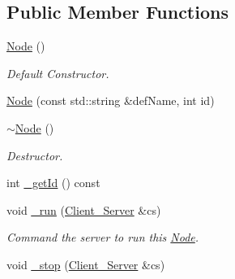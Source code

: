 \subsection*{Public Member Functions}
\begin{DoxyCompactItemize}
\item 
\hypertarget{classColliderPlusPlus_1_1Node_aaad80bfe23840414c3522f5a25f5771a}{\hyperlink{classColliderPlusPlus_1_1Node_aaad80bfe23840414c3522f5a25f5771a}{Node} ()}\label{classColliderPlusPlus_1_1Node_aaad80bfe23840414c3522f5a25f5771a}

\begin{DoxyCompactList}\small\item\em Default Constructor. \end{DoxyCompactList}\item 
\hyperlink{classColliderPlusPlus_1_1Node_a306340cc9340b97bbdd0df858c8a4185}{Node} (const std\-::string \&def\-Name, int id)
\item 
\hypertarget{classColliderPlusPlus_1_1Node_ae1198291ae5d81dd34474b7cf52438cd}{\hyperlink{classColliderPlusPlus_1_1Node_ae1198291ae5d81dd34474b7cf52438cd}{$\sim$\-Node} ()}\label{classColliderPlusPlus_1_1Node_ae1198291ae5d81dd34474b7cf52438cd}

\begin{DoxyCompactList}\small\item\em Destructor. \end{DoxyCompactList}\item 
int \hyperlink{classColliderPlusPlus_1_1Node_a261794de64a2198ca94e2c6410f3845f}{\-\_\-get\-Id} () const 
\item 
\hypertarget{classColliderPlusPlus_1_1Node_a97a4981f950823a4326bd87caa7826f0}{void \hyperlink{classColliderPlusPlus_1_1Node_a97a4981f950823a4326bd87caa7826f0}{\-\_\-run} (\hyperlink{classColliderPlusPlus_1_1Client__Server}{Client\-\_\-\-Server} \&cs)}\label{classColliderPlusPlus_1_1Node_a97a4981f950823a4326bd87caa7826f0}

\begin{DoxyCompactList}\small\item\em Command the server to run this \hyperlink{classColliderPlusPlus_1_1Node}{Node}. \end{DoxyCompactList}\item 
\hypertarget{classColliderPlusPlus_1_1Node_acb5dda7d418dfb041871815f2828f1ba}{void \hyperlink{classColliderPlusPlus_1_1Node_acb5dda7d418dfb041871815f2828f1ba}{\-\_\-stop} (\hyperlink{classColliderPlusPlus_1_1Client__Server}{Client\-\_\-\-Server} \&cs)}\label{classColliderPlusPlus_1_1Node_acb5dda7d418dfb041871815f2828f1ba}


\end{DoxyCompactItemize}
